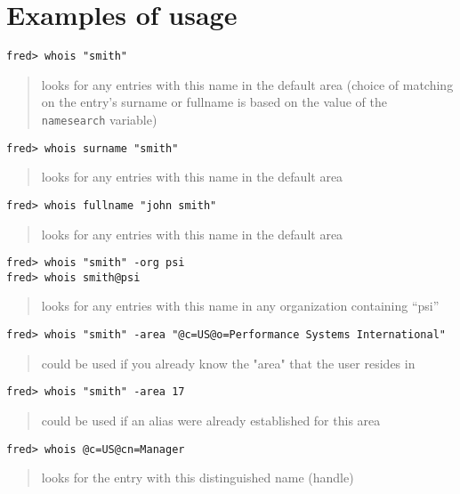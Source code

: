 \newpage

\section*	{Examples of usage}
\begin{verbatim}
fred> whois "smith"
\end{verbatim}
\begin{quote}
looks for any entries with this name in the default area
(choice of matching on the entry's surname or fullname is based on the value
of the \verb"namesearch" variable)
\end{quote}

\begin{verbatim}
fred> whois surname "smith"
\end{verbatim}
\begin{quote}
looks for any entries with this name in the default area
\end{quote}

\begin{verbatim}
fred> whois fullname "john smith"
\end{verbatim}
\begin{quote}
looks for any entries with this name in the default area
\end{quote}

\begin{verbatim}
fred> whois "smith" -org psi
fred> whois smith@psi
\end{verbatim}
\begin{quote}
looks for any entries with this name in any organization containing ``psi''
\end{quote}

\begin{verbatim}
fred> whois "smith" -area "@c=US@o=Performance Systems International"
\end{verbatim}
\begin{quote}
could be used if you already know the "area" that the user resides in
\end{quote}

\begin{verbatim}
fred> whois "smith" -area 17
\end{verbatim}
\begin{quote}
could be used if an alias were already established for this area
\end{quote}

\begin{verbatim}
fred> whois @c=US@cn=Manager
\end{verbatim}
\begin{quote}
looks for the entry with this distinguished name (handle)
\end{quote}

